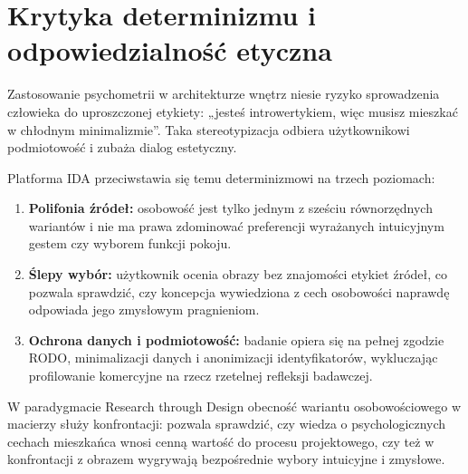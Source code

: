\section{Krytyka determinizmu i odpowiedzialność etyczna}
\label{ch05:sec:krytyka}

Zastosowanie psychometrii w architekturze wnętrz niesie ryzyko sprowadzenia człowieka do uproszczonej etykiety: „jesteś introwertykiem, więc musisz mieszkać w chłodnym minimalizmie”. Taka stereotypizacja odbiera użytkownikowi podmiotowość i zubaża dialog estetyczny.

Platforma IDA przeciwstawia się temu determinizmowi na trzech poziomach:
\begin{enumerate}
  \item \textbf{Polifonia źródeł:} osobowość jest tylko jednym z sześciu równorzędnych wariantów i nie ma prawa zdominować preferencji wyrażanych intuicyjnym gestem czy wyborem funkcji pokoju.
  \item \textbf{Ślepy wybór:} użytkownik ocenia obrazy bez znajomości etykiet źródeł, co pozwala sprawdzić, czy koncepcja wywiedziona z cech osobowości naprawdę odpowiada jego zmysłowym pragnieniom.
  \item \textbf{Ochrona danych i podmiotowość:} badanie opiera się na pełnej zgodzie RODO, minimalizacji danych i anonimizacji identyfikatorów, wykluczając profilowanie komercyjne na rzecz rzetelnej refleksji badawczej.
\end{enumerate}

W paradygmacie Research through Design obecność wariantu osobowościowego w macierzy służy konfrontacji: pozwala sprawdzić, czy wiedza o psychologicznych cechach mieszkańca wnosi cenną wartość do procesu projektowego, czy też w konfrontacji z obrazem wygrywają bezpośrednie wybory intuicyjne i zmysłowe.
